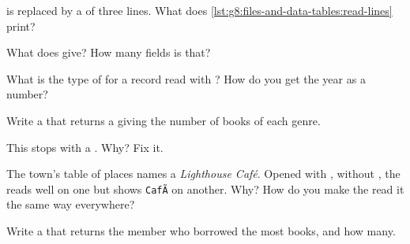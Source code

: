 \begin{exercise}[$\star$]\label{exo:g8:files-and-data-tables:1}
 is replaced by a  of three lines. What does
\cref{lst:g8:files-and-data-tables:read-lines} print?
\end{exercise}

\begin{exercise}[$\star$]\label{exo:g8:files-and-data-tables:2}
What does  give? How many fields is that?
\end{exercise}

\begin{exercise}[$\star$]\label{exo:g8:files-and-data-tables:3}
What is the type of  for a record read with
? How do you get the year as a number?
\end{exercise}

\begin{exercise}[$\star$]\label{exo:g8:files-and-data-tables:4}
Write a   that returns a  giving
the number of books of each genre.
\end{exercise}

\begin{exercise}[$\star\star$]\label{exo:g8:files-and-data-tables:5}
This  stops with a . Why? Fix it.

\label{lst:g8:files-and-data-tables:pages-bug}
\end{exercise}

\begin{exercise}[$\star\star$]\label{exo:g8:files-and-data-tables:6}
The town's table of places names a \emph{Lighthouse Café}. Opened with
, without , the  reads well on one
 but shows \texttt{Caf\~{A}\textcopyright} on another. Why? How do you make the 
read it the same way everywhere?
\end{exercise}

\begin{exercise}[$\star\star$]\label{exo:g8:files-and-data-tables:7}
Write a   that returns the member who borrowed
the most books, and how many.
\end{exercise}

